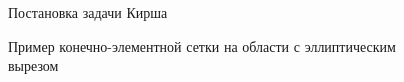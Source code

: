 \begin{figure}[ht]
    \caption{Постановка задачи Кирша}
    \label{fig:KirshProblem}
\end{figure}

\begin{figure}[ht]
    \caption{Пример конечно-элементной сетки на области с эллиптическим вырезом}
    \label{fig:KirshMesh}
\end{figure}

